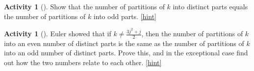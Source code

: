 \documentclass[10pt,]{book}
\theoremstyle{plain}
\theoremstyle{definition}
\theoremstyle{definition}
\theoremstyle{definition}
\newtheorem{activity}[project]{Activity}
\numberwithin{equation}{chapter}
\begin{document}
\begin{activity}[]\label{activity-307}
\hypertarget{p-1551}{}%
Show that the number of partitions of \(k\) into distinct parts equals the number of partitions of \(k\) into odd parts.%
\hfill{\tiny\hyperlink{a-314}{[hint]}\hypertarget{q-314}{}}\end{activity}
\begin{activity}[]\label{activity-308}
\hypertarget{p-1555}{}%
Euler showed that if \(k\not= \frac{3j^2+j}{2}\), then the number of partitions of \(k\) into an even number of distinct parts is the same as the number of partitions of \(k\) into an odd number of distinct parts. Prove this, and in the exceptional case find out how the two numbers relate to each other.%
\hfill{\tiny\hyperlink{a-315}{[hint]}\hypertarget{q-315}{}}\end{activity}
\typeout{************************************************}
\typeout{************************************************}
\end{document}
